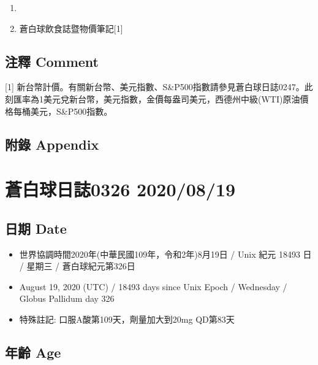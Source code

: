 \documentclass[a5paper, 11pt
]{book}
\providecommand{\tightlist}{%
  \setlength{\itemsep}{0pt}\setlength{\parskip}{0pt}}
\begin{document}
\begin{enumerate}
\def\labelenumi{\arabic{enumi}.}
\tightlist
\item
\item
  蒼白球飲食誌暨物價筆記{[}1{]}
\end{enumerate}

\hypertarget{ux6ce8ux91cb-comment-78}{%
\subsection{注釋 Comment}\label{ux6ce8ux91cb-comment-78}}

{[}1{]}
新台幣計價。有關新台幣、美元指數、S\&P500指數請參見蒼白球日誌0247。此刻匯率為1美元兌新台幣，美元指數，金價每盎司美元，西德州中級(WTI)原油價格每桶美元，S\&P500指數。

\hypertarget{ux9644ux9304-appendix-78}{%
\subsection{附錄 Appendix}\label{ux9644ux9304-appendix-78}}

\hypertarget{ux84bcux767dux7403ux65e5ux8a8c0326-20200819}{%
\section{蒼白球日誌0326
2020/08/19}\label{ux84bcux767dux7403ux65e5ux8a8c0326-20200819}}

\hypertarget{ux65e5ux671f-date-79}{%
\subsection{日期 Date}\label{ux65e5ux671f-date-79}}

\begin{itemize}
\tightlist
\item
  世界協調時間2020年(中華民國109年，令和2年)8月19日 / Unix 紀元 18493 日
  / 星期三 / 蒼白球紀元第326日
\item
  August 19, 2020 (UTC) / 18493 days since Unix Epoch / Wednesday /
  Globus Pallidum day 326
\item
  特殊註記: 口服A酸第109天，劑量加大到20mg QD第83天
\end{itemize}

\hypertarget{ux5e74ux9f61-age-79}{%
\subsection{年齡 Age}\label{ux5e74ux9f61-age-79}}
\end{document}
